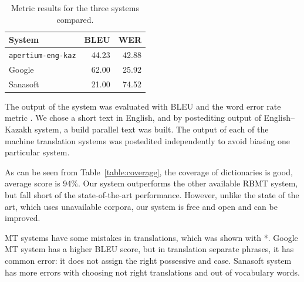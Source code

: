 \documentclass[11pt]{article}
\begin{document}
\begin{table}
  \centering
  \begin{tabular}{|l|r|r|}
    \hline
    \textbf{System} & \textbf{BLEU} & \textbf{WER} \\
    \hline
    \texttt{apertium-eng-kaz} & 44.23 & 42.88 \\
    Google & 62.00 & 25.92 \\
    Sanasoft & 21.00 & 74.52 \\
    \hline
  \end{tabular}
  \caption{Metric results for the three systems compared.}
  \label{table:metrics}
\end{table}

The output of the system was evaluated with BLEU \citep{papineni02} and the word error rate 
metric \citep{levenshtein/1966}. We chose a short text in English, and by postediting output 
of English--Kazakh system, a build parallel text was built. The output of each of the machine
translation systems was postedited independently to avoid biasing one particular system.

As can be seen from Table~\ref{table:coverage}, the coverage of dictionaries is good, average score is 94\%. Our system outperforms the other 
available RBMT system, but fall short of the state-of-the-art performance. However, unlike the state of 
the art, which uses unavailable corpora, our system is free and open and can be improved.

MT systems have some mistakes in translations, which was shown with *. Google MT system 
has a higher BLEU score, but in translation separate phrases, it has common error: it does not assign 
the right possessive and case. Sanasoft system has more errors with choosing not right translations 
and out of vocabulary words.
\end{document}
